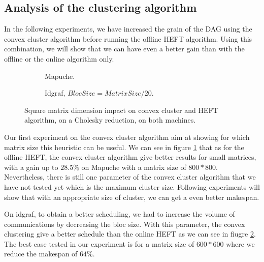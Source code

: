 \documentclass[10pt, conference, compsocconf,pdftex,dvipsnames]{IEEEtran}
\newcommand{\mytodo}[1]{\todo[inline]{#1}}
\begin{document}
\subsection{Analysis of the clustering algorithm}
\label{sec:exp-exp-clust}

In the following experiments, we have increased the grain of the DAG using the
convex cluster algorithm before running the offline HEFT algorithm. Using this
combination, we will show that we can have even a better gain than with the
offline or the online algorithm only.

\mytodo{refaire la courbe \ref{fig:MatIdgraf} : exp in progress}
\begin{figure}[tb]
        \centering
        \begin{subfigure}{0.4\textwidth}
            \hspace{-20pt}
            \scalebox{0.7}{
                
            }
            \caption{Mapuche.}
            \label{fig:MatMapuche}
        \end{subfigure}
        \hspace{15pt}
        \begin{subfigure}{0.55\textwidth}
            \scalebox{0.7}{
                
            }
            \caption{Idgraf, $BlocSize=MatrixSize/20$.}
            \label{fig:MatIdgraf}
        \end{subfigure}

    \caption{Square matrix dimension impact on convex cluster and HEFT
    algorithm, on a Cholesky reduction, on both machines.}
    \label{fig:Mat}
\end{figure}

Our first experiment on the convex cluster algorithm aim at showing for which
matrix size this heuristic can be useful. We can see in figure
\ref{fig:MatMapuche} that as for the offline HEFT, the convex cluster
algorithm give better results for small matrices, with a gain up to $28.5\%$
on Mapuche with a matrix size of $800*800$. Nevertheless, there is still one
parameter of the convex cluster algorithm that we have not tested yet which is
the maximum cluster size. Following experiments will show that with an
appropriate size of cluster, we can get a even better makespan.

On idgraf, to obtain a better scheduling, we had to increase the volume of
communications by decreasing the bloc size. With this parameter, the convex
clustering give a better schedule than the online HEFT as we can see in fiugre
\ref{fig:MatIdgraf}.  The best case tested in our experiment is for a matrix
size of $600*600$ where we reduce the makespan of $64\%$.
\end{document}
